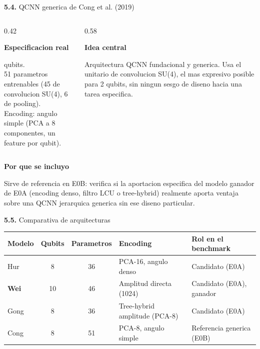 \documentclass[aspectratio=169]{beamer}
\newcommand{\bmheading}[2]{\textbf{\color{#1}#2}\par\smallskip}
\newcommand{\bandedtable}{\rowcolors{2}{white}{bmRowAlt}}
\newcommand{\subsec}[2]{\textbf{\color{bmIndigo}#1.} #2}
\newcommand{\winner}[1]{\textbf{#1}}
\begin{document}
\begin{frame}{\subsec{5.4}{QCNN generica de Cong et al. (2019)}}
  \footnotesize
  \begin{columns}[T]
    \begin{column}{0.42\textwidth}
      \begin{bluebox}
        \bmheading{bmBlue}{Especificacion real}
        8 qubits.\\
        51 parametros entrenables (45 de convolucion SU(4), 6 de pooling).\\
        Encoding: angulo simple (PCA a 8 componentes, un feature por qubit).
      \end{bluebox}
    \end{column}
    \begin{column}{0.58\textwidth}
      \begin{indigobox}
        \bmheading{bmIndigo}{Idea central}
        Arquitectura QCNN fundacional y generica. Usa el unitario de
        convolucion SU(4), el mas expresivo posible para 2 qubits, sin ningun
        sesgo de diseno hacia una tarea especifica.
      \end{indigobox}
    \end{column}
  \end{columns}
  \vspace{8pt}
  \begin{amberbox}
    \bmheading{bmAmber}{Por que se incluyo}
    Sirve de referencia en E0B: verifica si la aportacion especifica del
    modelo ganador de E0A (encoding denso, filtro LCU o tree-hybrid) realmente
    aporta ventaja sobre una QCNN jerarquica generica sin ese diseno
    particular.
  \end{amberbox}
\end{frame}

\begin{frame}{\subsec{5.5}{Comparativa de arquitecturas}}
  \footnotesize
  \bandedtable
  \begin{tabular}{@{}lccp{3.4cm}p{3.2cm}@{}}
    \toprule
    \textbf{Modelo} & \textbf{Qubits} & \textbf{Parametros} & \textbf{Encoding} &
      \textbf{Rol en el benchmark} \\
    \midrule
    Hur  & 8  & 36 & PCA-16, angulo denso & Candidato (E0A) \\
    \winner{Wei}  & 10 & 46 & Amplitud directa (1024) & Candidato (E0A), ganador \\
    Gong & 8  & 36 & Tree-hybrid amplitude (PCA-8) & Candidato (E0A) \\
    Cong & 8  & 51 & PCA-8, angulo simple & Referencia generica (E0B) \\
    \bottomrule
  \end{tabular}
\end{frame}
\end{document}

